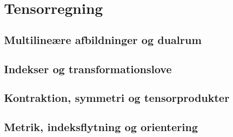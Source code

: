 \chapter{Tensorregning}
\section{Multilineære afbildninger og dualrum}
\leavevmode\par

\section{Indekser og transformationslove}
\leavevmode\par

\section{Kontraktion, symmetri og tensorprodukter}
\leavevmode\par

\section{Metrik, indeksflytning og orientering}
\leavevmode\par
